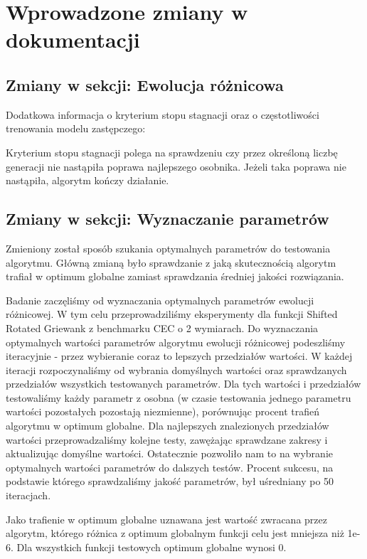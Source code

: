 \documentclass{article}
\begin{document}
\section{Wprowadzone zmiany w dokumentacji}

\subsection{Zmiany w sekcji: Ewolucja różnicowa}

Dodatkowa informacja o kryterium stopu stagnacji oraz o częstotliwości trenowania modelu zastępczego:

Kryterium stopu stagnacji polega na sprawdzeniu czy przez określoną liczbę generacji nie nastąpiła poprawa najlepszego osobnika. Jeżeli taka poprawa nie nastąpiła, algorytm kończy działanie.

\subsection{Zmiany w sekcji: Wyznaczanie parametrów}

Zmieniony został sposób szukania optymalnych parametrów do testowania algorytmu. Główną zmianą było sprawdzanie z jaką skutecznością algorytm trafiał w optimum globalne zamiast sprawdzania średniej jakości rozwiązania.

Badanie zaczęliśmy od wyznaczania optymalnych parametrów ewolucji różnicowej. W tym celu przeprowadziliśmy eksperymenty dla funkcji Shifted Rotated Griewank z benchmarku CEC o 2 wymiarach. Do wyznaczania optymalnych wartości parametrów algorytmu ewolucji różnicowej podeszliśmy iteracyjnie - przez wybieranie coraz to lepszych przedziałów wartości. W każdej iteracji rozpoczynaliśmy od wybrania domyślnych wartości oraz sprawdzanych przedziałów wszystkich testowanych parametrów. Dla tych wartości i przedziałów testowaliśmy każdy parametr z osobna (w czasie testowania jednego parametru wartości pozostałych pozostają niezmienne), porównując procent trafień algorytmu w optimum globalne. Dla najlepszych znalezionych przedziałów wartości przeprowadzaliśmy kolejne testy, zawężając sprawdzane zakresy i aktualizując domyślne wartości. Ostatecznie pozwoliło nam to na wybranie optymalnych wartości parametrów do dalszych testów. Procent sukcesu, na podstawie którego sprawdzaliśmy jakość parametrów, był uśredniany po 50 iteracjach. 

Jako trafienie w optimum globalne uznawana jest wartość zwracana przez algorytm, którego różnica z optimum globalnym funkcji celu jest mniejsza niż 1e-6. Dla wszystkich funkcji testowych optimum globalne wynosi 0.
\end{document}
